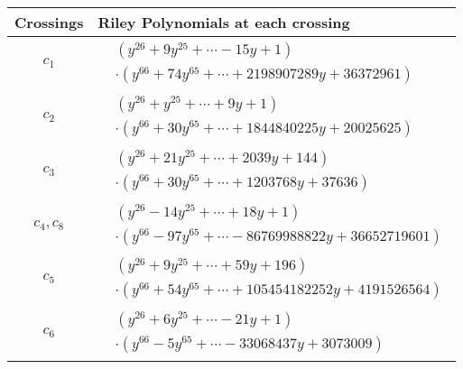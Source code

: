 \documentclass[1p]{elsarticle_modified}
\theoremstyle{definition}
\begin{document}
\begin{tabular}{m{50pt}|m{274pt}}
Crossings & \hspace{64pt}Riley Polynomials at each crossing \\
\hline $$\begin{aligned}c_{1}\end{aligned}$$&$\begin{aligned}
&(y^{26}+9 y^{25}+\cdots-15 y+1)\\
&\cdot(y^{66}+74 y^{65}+\cdots+2198907289 y+36372961)
\end{aligned}$\\
\hline $$\begin{aligned}c_{2}\end{aligned}$$&$\begin{aligned}
&(y^{26}+y^{25}+\cdots+9 y+1)\\
&\cdot(y^{66}+30 y^{65}+\cdots+1844840225 y+20025625)
\end{aligned}$\\
\hline $$\begin{aligned}c_{3}\end{aligned}$$&$\begin{aligned}
&(y^{26}+21 y^{25}+\cdots+2039 y+144)\\
&\cdot(y^{66}+30 y^{65}+\cdots+1203768 y+37636)
\end{aligned}$\\
\hline $$\begin{aligned}c_{4},c_{8}\end{aligned}$$&$\begin{aligned}
&(y^{26}-14 y^{25}+\cdots+18 y+1)\\
&\cdot(y^{66}-97 y^{65}+\cdots-86769988822 y+36652719601)
\end{aligned}$\\
\hline $$\begin{aligned}c_{5}\end{aligned}$$&$\begin{aligned}
&(y^{26}+9 y^{25}+\cdots+59 y+196)\\
&\cdot(y^{66}+54 y^{65}+\cdots+105454182252 y+4191526564)
\end{aligned}$\\
\hline $$\begin{aligned}c_{6}\end{aligned}$$&$\begin{aligned}
&(y^{26}+6 y^{25}+\cdots-21 y+1)\\
&\cdot(y^{66}-5 y^{65}+\cdots-33068437 y+3073009)
\end{aligned}$\\

\end{tabular}
\end{document}
